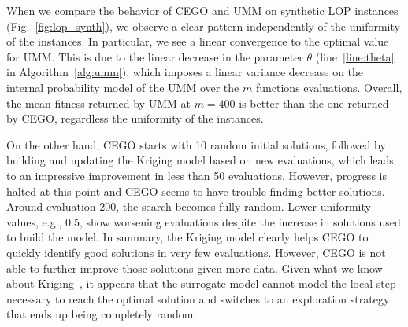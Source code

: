\documentclass[runningheads]{llncs}
\newcommand{\FEmax}{\ensuremath{m}}
\begin{document}
When we compare the behavior of CEGO and
UMM on synthetic LOP instances (Fig.~\ref{fig:lop_synth}), we observe a clear
pattern independently of the uniformity of the instances. In particular, we see
a linear convergence to the optimal value for UMM.  This is due to the linear
decrease in the parameter $\theta$ (line~\ref{line:theta} in
Algorithm~\ref{alg:umm}), which imposes a linear variance decrease on the
internal probability model of the UMM over the $\FEmax$ functions
evaluations. Overall, the mean fitness returned by UMM at $\FEmax=400$ is better than the one returned by  CEGO, regardless the uniformity of the instances.





On the other hand, %
CEGO starts with 10 random initial solutions, %
followed by building and updating the Kriging model based on new
evaluations, which leads to an impressive improvement in less than 50
evaluations. However, progress is halted at this point and CEGO seems to
have trouble finding better solutions. Around evaluation 200, the search
becomes fully random. Lower uniformity values, e.g., 0.5, show worsening
evaluations despite the increase in solutions used to build the model. In
summary, the Kriging model clearly helps CEGO to quickly identify good
solutions in very few evaluations. However, CEGO is not able
to further improve those solutions given more data. Given what we know about
Kriging~\citep{EriPeaGar2019scalable}, it appears that the surrogate model cannot model the local step
necessary to reach the optimal solution and switches to an exploration strategy
that ends up being completely random.

\end{document}
